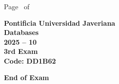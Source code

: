 \documentclass[11pt, addpoints]{exam}\usepackage[utf8]{inputenc}
\begin{document}
\begin{coverpages}
\begin{center}
			\vspace{3mm}
			\leavevmode \hspace{5mm} 
		\end{center}
	\end{coverpages}

	\footer{} {Page \thepage\ of \numpages} {}

	\centering
	\textbf{\Large Pontificia Universidad Javeriana}\\
	\textbf{\Large Databases} \\
	\textbf{\large 2025 -- 10} \\
	\textbf{\large 3rd Exam} \\
	\textbf{Code: DD1B62}


	\begin{questions}
		
		
		
		
		
		
		
		
		
		
		
		
		
		
		
		
		
		
		
		
	\end{questions}

	\vspace{5mm}
	\noindent \textbf{End of Exam}
\end{document}

